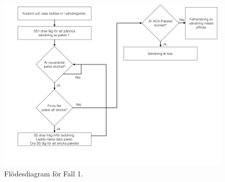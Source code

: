 \documentclass[a4paper,12pt,fleqn]{article}
\begin{document}
\begin{figure}[htp] %
  \begin{center}
  \includegraphics[keepaspectratio=true,width=\linewidth]{SPIbild002.jpg}  %
  \end{center}
  \caption{Flödesdiagram för Fall 1.} %
  \label{fig:case1flow}
\end{figure}
\end{document}
